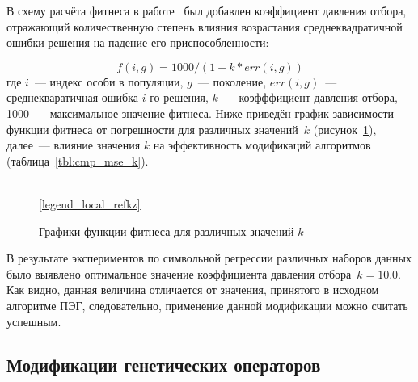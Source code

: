 В схему расчёта фитнеса в работе~\cite{Lopes:2004:AMCS} был добавлен коэффициент давления отбора, отражающий количественную степень влияния возрастания среднеквадратичной ошибки решения на падение его приспособленности:

\begin{equation}
\label{eq:EGIPSYS_fitness}
f(i, g) = 1000 / (1 + k * err(i, g))
\end{equation}
где $i$~--- индекс особи в популяции, $g$~--- поколение, $err(i, g)$~--- среднекваратичная ошибка $i$-го решения, $k$~--- коэфффициент давления отбора, 1000~--- максимальное значение фитнеса. Ниже приведён график зависимости функции фитнеса от погрешности для различных значений~$k$ (рисунок~\ref{img:kz}), далее~--- влияние значения $k$ на эффективность модификаций алгоритмов (таблица~\ref{tbl:cmp_mse_k}).

\begin{figure} [h]
  \center
  \\
  \ref{legend_local_refkz}
  \caption{Графики функции фитнеса для различных значений $k$}
  \label{img:kz}
\end{figure}



В результате экспериментов по символьной регрессии различных наборов данных было выявлено оптимальное значение коэффициента давления отбора~$k=10.0$. Как видно, данная величина отличается от значения, принятого в исходном алгоритме ПЭГ, следовательно, применение данной модификации можно считать успешным. 


\subsection{Модификации генетических операторов}

